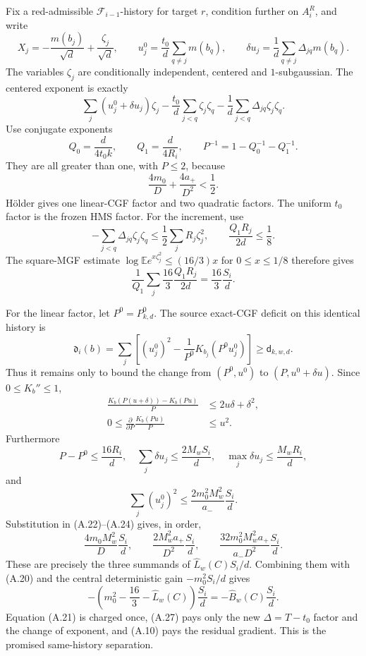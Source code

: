 Fix a red-admissible \(\mathcal F_{i-1}\)-history for target \(r\), condition
further on \(A_i^R\), and write
\[
 X_j=-\frac{m(b_j)}{\sqrt d}+\frac{\zeta_j}{\sqrt d},\qquad
 u_j^0=\frac{t_0}{d}\sum_{q\ne j}m(b_q),\qquad
 \delta u_j=\frac1d\sum_{q\ne j}\Delta_{jq}m(b_q).
\tag{A.15}
\]
The variables \(\zeta_j\) are conditionally independent, centered and
\(1\)-subgaussian.  The centered exponent is exactly
\[
 \sum_j(u_j^0+\delta u_j)\zeta_j
 -\frac{t_0}{d}\sum_{j<q}\zeta_j\zeta_q
 -\frac1d\sum_{j<q}\Delta_{jq}\zeta_j\zeta_q.
\tag{A.16}
\]
Use conjugate exponents
\[
 Q_0=\frac d{4t_0k},\qquad Q_1=\frac d{4R_i},\qquad
 P^{-1}=1-Q_0^{-1}-Q_1^{-1}. \tag{A.17}
\]
They are all greater than one, with \(P\le2\), because
\[
 \frac{4m_0}{D}+\frac{4a_+}{D^2}<\frac12. \tag{A.18}
\]
H\"older gives one linear-CGF factor and two quadratic factors.  The
uniform \(t_0\) factor is the frozen HMS factor.  For the increment, use
\[
 -\sum_{j<q}\Delta_{jq}\zeta_j\zeta_q
 \le\frac12\sum_jR_j\zeta_j^2,\qquad
 \frac{Q_1R_j}{2d}\le\frac18.
\tag{A.19}
\]
The square-MGF estimate
\(\log\mathbb E e^{x\zeta_j^2}\le(16/3)x\) for \(0\le x\le1/8\)
therefore gives
\[
 \frac1{Q_1}\sum_j\frac{16}{3}\frac{Q_1R_j}{2d}
 =\frac{16}{3}\frac{S_i}{d}.
\tag{A.20}
\]

For the linear factor, let \(P^0=P^0_{k,d}\).  The source exact-CGF deficit
on this identical history is
\[
 \mathfrak d_i(b)=\sum_j\left[(u_j^0)^2
 -\frac1{P^0}K_{b_j}(P^0u_j^0)\right]
 \ge\mathsf d_{k,w,d}.
\tag{A.21}
\]
Thus it remains only to bound the change from
\((P^0,u^0)\) to \((P,u^0+\delta u)\).  Since \(0\le K_b''\le1\),
\begin{align}
 \frac{K_b(P(u+\delta))-K_b(Pu)}P
 &\le2u\delta+\delta^2,\tag{A.22}\\
 0\le\frac{\partial}{\partial P}\frac{K_b(Pu)}P
 &\le u^2.\tag{A.23}
\end{align}
Furthermore
\[
 P-P^0\le\frac{16R_i}{d},\quad
 \sum_j\delta u_j\le\frac{2M_wS_i}{d},\quad
 \max_j\delta u_j\le\frac{M_wR_i}{d},
\tag{A.24}
\]
and
\[
 \sum_j(u_j^0)^2\le
 \frac{2m_0^2M_w^2}{a_-}\frac{S_i}{d}.
\tag{A.25}
\]
Substitution in (A.22)--(A.24) gives, in order,
\[
 \frac{4m_0M_w^2}{D}\frac{S_i}{d},\qquad
 \frac{2M_w^2a_+}{D^2}\frac{S_i}{d},\qquad
 \frac{32m_0^2M_w^2a_+}{a_-D^2}\frac{S_i}{d}.
\tag{A.26}
\]
These are precisely the three summands of
\(\widehat L_w(C)S_i/d\).  Combining them with (A.20) and the central
deterministic gain \(-m_0^2S_i/d\) gives
\[
 -\left(m_0^2-\frac{16}{3}-\widehat L_w(C)\right)\frac{S_i}{d}
 =-\widehat B_w(C)\frac{S_i}{d}. \tag{A.27}
\]
Equation (A.21) is charged once, (A.27) pays only the new
\(\Delta=T-t_0\) factor and the change of exponent, and (A.10) pays the
residual gradient.  This is the promised same-history separation.

